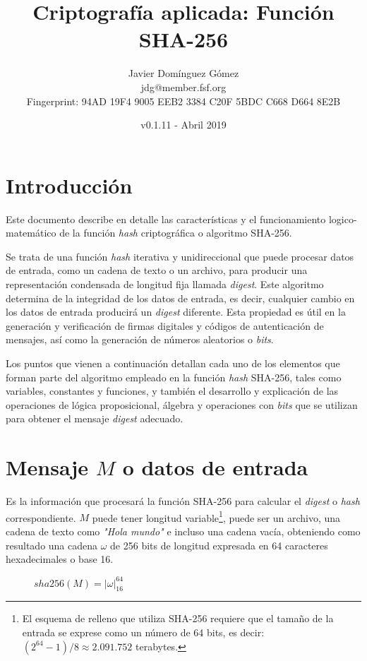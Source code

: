 \documentclass{article}
\title{\textbf{Criptografía aplicada: Función SHA-256}}
\author{Javier Domínguez Gómez \\
\small{jdg@member.fsf.org} \\
\small{Fingerprint: 94AD 19F4 9005 EEB2 3384 C20F 5BDC C668 D664 8E2B}}
\date{v0.1.11 - Abril 2019}
\begin{document}
\maketitle

\tableofcontents{}

\section{Introducción}
    Este documento describe en detalle las características y el funcionamiento logico-matemático de la función \textit{hash} criptográfica o algoritmo SHA-256.
    
    \vspace{3mm}
    Se trata de una función \textit{hash} iterativa y unidireccional que puede procesar datos de entrada, como un cadena de texto o un archivo, para producir una representación condensada de longitud fija llamada \textit{digest}. Este algoritmo determina de la integridad de los datos de entrada, es decir, cualquier cambio en los datos de entrada producirá un \textit{digest} diferente. Esta propiedad es útil en la generación y verificación de firmas digitales y códigos de autenticación de mensajes, así como la generación de números aleatorios o \textit{bits}.
    
    \vspace{3mm}
    Los puntos que vienen a continuación detallan cada uno de los elementos que forman parte del algoritmo empleado en la función \textit{hash} SHA-256, tales como variables, constantes y funciones, y también el desarrollo y explicación de las operaciones de lógica proposicional, álgebra y operaciones con \textit{bits} que se utilizan para obtener el mensaje \textit{digest} adecuado.

\section{Mensaje $M$ o datos de entrada}
    Es la información que procesará la función SHA-256 para calcular el \textit{digest} o \textit{hash} correspondiente. $M$ puede tener longitud variable\footnote{El esquema de relleno que utiliza SHA-256 requiere que el tamaño de la entrada se exprese como un número de 64 bits, es decir: $(2^{64}-1)/8 \approx 2.091.752$ terabytes.}, puede ser un archivo, una cadena de texto como \textit{"Hola mundo"} e incluso una cadena vacía, obteniendo como resultado una cadena $\omega$ de 256 bits de longitud expresada en 64 caracteres hexadecimales o base 16.
        \begin{figure}[H]
        \centering
            $sha256(M) = |\omega|^{64}_{16}$
        \end{figure}
        
\end{document}
